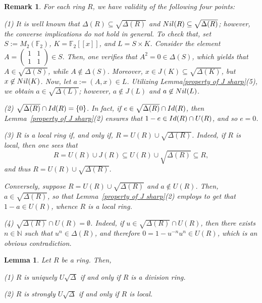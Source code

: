 \documentclass[10pt,a4paper]{amsart}
\newtheorem{lemma}{Lemma}
\newtheorem{remark}{Remark}
\begin{document}
\begin{remark}\label{local}
For each ring \( R \), we have validity of the following four points:

(1) It is well known that $\Delta(R)\subseteq \sqrt{\Delta(R)}$ and ${\rm Nil}(R)\subseteq \sqrt{\Delta(R)}$;
however, the converse implications do {\it not} hold in general. To check that, set $S:=M_{2}(\mathbb{F}_{2})$,
$K=\mathbb{F}_{2}[[x]]$, and $L=S\times K$. Consider the element
$
A=\begin{pmatrix}
	1 & 1\\
	1 & 1
\end{pmatrix}\in S.
$
Then, one verifies that $A^{2}=0\in \Delta(S)$, which yields that $A\in \sqrt{\Delta(S)}$, while
$A\not\in \Delta(S)$. Moreover, $x\in J(K)\subseteq \sqrt{\Delta(K)}$, but
$x\not\in {\rm Nil}(K)$. Now, let $a:=(A,x)\in L$. Utilizing Lemma\ref{property of J sharp}(5), we obtain
$a\in \sqrt{\Delta(L)}$; however, $a\not\in J(L)$ and $a\not\in {\rm Nil}(L)$.

(2) \( \sqrt{\Delta(R)} \cap {\rm Id}(R) = \{0\} \). In fact, if \( e \in \sqrt{\Delta(R)} \cap {\rm Id}(R) \), then Lemma~\ref{property of J sharp}(2) ensures that \( 1-e \in {\rm Id}(R) \cap U(R) \), and so \( e=0 \).

(3) \( R \) is a local ring if, and only if, \( R=U(R) \cup \sqrt{\Delta(R)} \). Indeed, if \( R \) is local, then
one sees that \[ R=U(R) \cup J(R) \subseteq U(R) \cup \sqrt{\Delta(R)} \subseteq R ,\] and thus \( R=U(R) \cup \sqrt{\Delta(R)} \).

Conversely, suppose \( R=U(R) \cup \sqrt{\Delta(R)} \) and \( a \notin U(R) \). Then, \( a \in \sqrt{\Delta(R)} \), so that Lemma~\ref{property of J sharp}(2) employs to get that \( 1-a \in U(R) \), whence \( R \) is a local ring.

(4) \( \sqrt{\Delta(R)} \cap U(R) = \emptyset \). Indeed, if \( u \in \sqrt{\Delta(R)} \cap U(R) \), then there exists \( n \in \mathbb{N} \) such that \( u^n \in \Delta(R) \), and therefore \( 0=1-u^{-n}u^n \in U(R) \), which is an obvious contradiction.
\end{remark}

\begin{lemma}
Let $R$ be a ring. Then,

(1) $R$ is uniquely $U\sqrt{\Delta}$ if and only if $R$ is a division ring.

(2) $R$ is strongly $U\sqrt{\Delta}$ if and only if $R$ is local.
\end{lemma}
\end{document}
